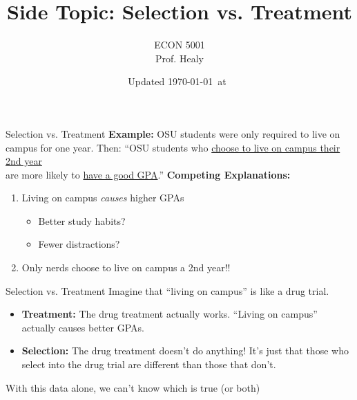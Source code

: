 

\title[Selection vs. Treatment]{Side Topic: Selection vs. Treatment}
\author[ECON 5001]{ECON 5001\\Prof. Healy} \color{metrop}
\institute[OSU]{}
\date[]{\vfill {\tiny Updated \today\ at\ \DTMcurrenttime}}



\frame{\maketitle}

\begin{frame}{Selection vs. Treatment}
\textbf{Example:} OSU students were only required to live on campus for one year. Then:\bsk
``OSU students who \uline{choose to live on campus their 2nd year}\\are more likely to \uline{have a good GPA}.''
\bsk
\textbf{Competing Explanations:}
\begin{enumerate}
    \item<2-> Living on campus \textit{causes} higher GPAs
    \begin{itemize}
        \item<3-> Better study habits?
        \item<3-> Fewer distractions?
    \end{itemize}
    \item<4> Only nerds choose to live on campus a 2nd year!!
\end{enumerate}
\end{frame}

\begin{frame}{Selection vs. Treatment}
    Imagine that ``living on campus'' is like a drug trial.
    \bsk
    \begin{itemize}
        \item \textbf{Treatment:} The drug treatment actually works. ``Living on campus'' actually causes better GPAs.
        \item \textbf{Selection:} The drug treatment doesn't do anything! It's just that those who select into the drug trial are different than those that don't.
    \end{itemize}
    \bsk
    With this data alone, we can't know which is true (or both)
\end{frame}

